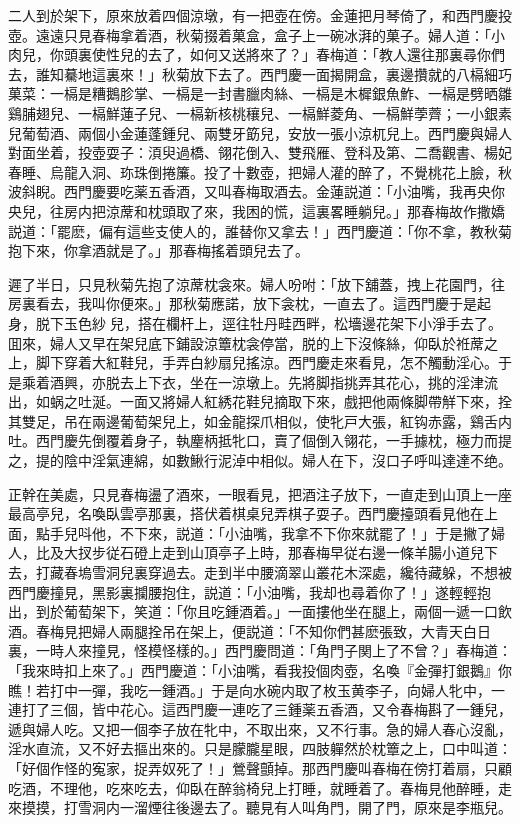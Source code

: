 二人到於架下，原來放着四個涼墩，有一把壺在傍。金蓮把月琴倚了，和西門慶投壺。遠遠只見春梅拿着酒，秋菊掇着菓盒，盒子上一碗冰湃的菓子。婦人道：「小肉兒，你頭裏使性兒的去了，如何又送將來了？」春梅道：「教人還往那裏尋你們去，誰知驀地這裏來！」秋菊放下去了。西門慶一面揭開盒，裏邊攢就的八槅細巧菓菜：一槅是糟鵝胗掌、一槅是一封書臘肉絲、一槅是木樨銀魚鮓、一槅是劈晒雛鷄脯翅兒、一槅鮮蓮子兒、一槅新核桃穰兒、一槅鮮菱角、一槅鮮荸薺；一小銀素兒葡萄酒、兩個小金蓮蓬鍾兒、兩雙牙筯兒，安放一張小涼杌兒上。西門慶與婦人對面坐着，投壺耍子：湏臾過橋、翎花倒入、雙飛雁、登科及第、二喬觀書、楊妃春睡、烏龍入洞、珎珠倒捲簾。投了十數壺，把婦人灌的醉了，不覺桃花上臉，秋波斜睨。西門慶要吃薬五香酒，又叫春梅取酒去。金蓮説道：「小油嘴，我再央你央兒，往房内把涼蓆和枕頭取了來，我困的慌，這裏畧睡躺兒。」那春梅故作撒嬌説道：「罷麽，偏有這些支使人的，誰替你又拿去！」西門慶道：「你不拿，教秋菊抱下來，你拿酒就是了。」那春梅搖着頭兒去了。

遲了半日，只見秋菊先抱了涼蓆枕衾來。婦人吩咐：「放下舖蓋，拽上花園門，往房裏看去，我叫你便來。」那秋菊應諾，放下衾枕，一直去了。這西門慶于是起身，脱下玉色紗𧜽兒，搭在欄杆上，逕往牡丹畦西畔，松墻邊花架下小淨手去了。囬來，婦人又早在架兒底下鋪設涼簟枕衾停當，脱的上下沒條絲，仰臥於袵蓆之上，脚下穿着大紅鞋兒，手弄白紗扇兒搖涼。西門慶走來看見，怎不觸動淫心。于是乘着酒興，亦脱去上下衣，坐在一涼墩上。先將脚指挑弄其花心，挑的淫津流出，如蜗之吐涎。一面又將婦人紅綉花鞋兒摘取下來，戲把他兩條脚帶觧下來，拴其雙足，吊在兩邊葡萄架兒上，如金龍探爪相似，使牝戸大張，紅钩赤露，鷄舌内吐。西門慶先倒覆着身子，執麈柄抵牝口，賣了個倒入翎花，一手據枕，極力而提之，提的陰中淫氣連綿，如數鰍行泥淖中相似。婦人在下，沒口子呼叫達達不绝。

正幹在美處，只見春梅盪了酒來，一眼看見，把酒注子放下，一直走到山頂上一座最高亭兒，名喚臥雲亭那裏，搭伏着棋桌兒弄棋子耍子。西門慶擡頭看見他在上面，點手兒呌他，不下來，説道：「小油嘴，我拿不下你來就罷了！」于是撇了婦人，比及大扠步従石磴上走到山頂亭子上時，那春梅早従右邊一條羊腸小道兒下去，打藏春塢雪洞兒裏穿過去。走到半中腰滴翠山叢花木深處，纔待藏躲，不想被西門慶撞見，黑影裏攔腰抱住，説道：「小油嘴，我却也尋着你了！」遂輕輕抱出，到於葡萄架下，笑道：「你且吃鍾酒着。」一面摟他坐在腿上，兩個一遞一口飲酒。春梅見把婦人兩腿拴吊在架上，便説道：「不知你們甚麽張致，大青天白日裏，一時人來撞見，怪模怪樣的。」西門慶問道：「角門子関上了不曾？」春梅道：「我來時扣上來了。」西門慶道：「小油嘴，看我投個肉壺，名喚『金彈打銀鵝』你瞧！若打中一彈，我吃一鍾酒。」于是向水碗内取了枚玉黄李子，向婦人牝中，一連打了三個，皆中花心。這西門慶一連吃了三鍾薬五香酒，又令春梅斟了一鍾兒，遞與婦人吃。又把一個李子放在牝中，不取出來，又不行事。急的婦人春心沒亂，淫水直流，又不好去摳出來的。只是朦朧星眼，四肢軃然於枕簟之上，口中叫道：「好個作怪的寃家，捉弄奴死了！」鶯聲顫掉。那西門慶叫春梅在傍打着扇，只顧吃酒，不理他，吃來吃去，仰臥在醉翁椅兒上打睡，就睡着了。春梅見他醉睡，走來摸摸，打雪洞内一溜煙往後邊去了。聽見有人叫角門，開了門，原來是李瓶兒。

